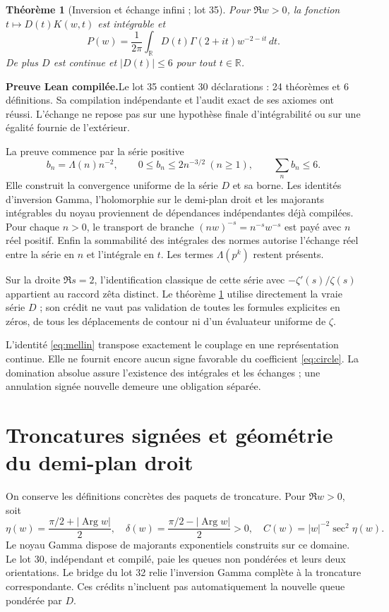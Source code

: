 \documentclass[11pt,a4paper]{article}
\newtheorem{theorem}{Théorème}[section]
\theoremstyle{remark}
\newcommand{\Lam}{\Lambda}
\newcommand{\R}{\mathbb R}
\newcommand{\paid}{\textbf{Preuve Lean compilée.}\space}
\DeclareMathOperator{\Arg}{Arg}
\begin{document}
\begin{theorem}[Inversion et échange infini ; lot 35]\label{thm:mellin}
Pour $\Re w>0$, la fonction $t\mapsto D(t)K(w,t)$ est intégrable et
\begin{equation}\label{eq:mellin}
P(w)=\frac1{2\pi}\int_{\R}D(t)\Gamma(2+it)w^{-2-it}\,dt.
\end{equation}
De plus $D$ est continue et $|D(t)|\le6$ pour tout $t\in\R$.
\end{theorem}
\paid Le lot 35 contient 30 déclarations : 24 théorèmes et 6
définitions. Sa compilation indépendante et l'audit exact de ses axiomes
ont réussi. L'échange ne repose pas sur une hypothèse finale d'intégrabilité
ou sur une égalité fournie de l'extérieur.

La preuve commence par la série positive
\[
b_n=\Lam(n)n^{-2},\qquad
0\le b_n\le 2n^{-3/2}\ (n\ge1),\qquad \sum_n b_n\le6.
\]
Elle construit la convergence uniforme de la série $D$ et sa borne.
Les identités d'inversion Gamma, l'holomorphie sur le demi-plan droit et
les majorants intégrables du noyau proviennent de dépendances indépendantes
déjà compilées. Pour chaque $n>0$, le transport de branche
$(nw)^{-s}=n^{-s}w^{-s}$ est payé avec $n$ réel positif. Enfin la
sommabilité des intégrales des normes autorise l'échange réel entre la
série en $n$ et l'intégrale en $t$. Les termes $\Lam(p^k)$ restent présents.

Sur la droite $\Re s=2$, l'identification classique de cette série avec
$-\zeta'(s)/\zeta(s)$ appartient au raccord zêta distinct. Le théorème
\ref{thm:mellin} utilise directement la vraie série $D$ ; son crédit ne
vaut pas validation de toutes les formules explicites en zéros, de tous
les déplacements de contour ni d'un évaluateur uniforme de $\zeta$.

L'identité \eqref{eq:mellin} transpose exactement le couplage en une
représentation continue. Elle ne fournit encore aucun signe favorable du
coefficient \eqref{eq:circle}. La domination absolue assure l'existence
des intégrales et les échanges ; une annulation signée nouvelle demeure
une obligation séparée.

\clearpage
\section{Troncatures signées et géométrie du demi-plan droit}\label{sec:tails}
On conserve les définitions concrètes des paquets de troncature. Pour
$\Re w>0$, soit
\begin{equation}\label{eq:Cdelta}
\eta(w)=\frac{\pi/2+|\Arg w|}{2},\quad
\delta(w)=\frac{\pi/2-|\Arg w|}{2}>0,\quad
C(w)=|w|^{-2}\sec^2\eta(w).
\end{equation}
Le noyau Gamma dispose de majorants exponentiels construits sur ce domaine.
Le lot 30, indépendant et compilé, paie les queues non pondérées et leurs
deux orientations. Le bridge du lot 32 relie l'inversion Gamma complète
à la troncature correspondante. Ces crédits n'incluent pas automatiquement
la nouvelle queue pondérée par $D$.
\end{document}
